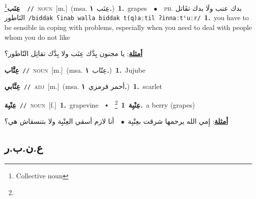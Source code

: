 \documentclass[10pt,a4paper,twoside]{article} %
\begin{document}
\begin{multicols}{2}
{\setlength\topsep{0pt}\textbf{\foreignlanguage{arabic}{عِنَب}}\footnote{Collective noun}\ \ {\color{gray}\texttt{//}\color{black}}\ \textsc{noun}\ [m.]\ \color{gray}(msa. \foreignlanguage{arabic}{عِنَب}~\foreignlanguage{arabic}{\textbf{١.}})\color{black}\ \textbf{1.}~grapes\ \ $\bullet$\ \ \textsc{ph.} \color{gray} \foreignlanguage{arabic}{بدك عنب ولَا بدك تقَاتل النَاطور}\color{black}\ {\color{gray}\texttt{/{\sffamily biddak ʕinab walla biddak t(q)aːtil ʔinnaːtˤuːr}/}\color{black}}\ \textbf{1.}~you have to be sensible in coping with problems, especially when you need to deal with people whom you do not like\  \begin{flushright}\color{gray}\foreignlanguage{arabic}{\textbf{\underline{\foreignlanguage{arabic}{أمثلة}}}: يا مجنون بِدَّك عِنَب ولا بِدَّك تقاتِل النّاطور؟}\end{flushright}\color{black}} \vspace{2mm}

{\setlength\topsep{0pt}\textbf{\foreignlanguage{arabic}{عِنَّاب}}\ {\color{gray}\texttt{//}\color{black}}\ \textsc{noun}\ [m.]\ \color{gray}(msa. \foreignlanguage{arabic}{عِنّاب}~\foreignlanguage{arabic}{\textbf{١.}})\color{black}\ \textbf{1.}~Jujube\ } \vspace{2mm}

{\setlength\topsep{0pt}\textbf{\foreignlanguage{arabic}{عِنَّابي}}\ {\color{gray}\texttt{//}\color{black}}\ \textsc{adj}\ [m.]\ \color{gray}(msa. \foreignlanguage{arabic}{أحمر قرمزي}~\foreignlanguage{arabic}{\textbf{١.}})\color{black}\ \textbf{1.}~scarlet\ } \vspace{2mm}

{\setlength\topsep{0pt}\textbf{\foreignlanguage{arabic}{عِنْبِة}}\ {\color{gray}\texttt{//}\color{black}}\ \textsc{noun}\ [f.]\ \textbf{1.}~grapevine\ \ $\smblkdiamond$\ \ \setlength\topsep{0pt}\textbf{\foreignlanguage{arabic}{عِنْبِة}}\ \footnote{}\ \textbf{1.}~a berry (grapes)\  \begin{flushright}\color{gray}\foreignlanguage{arabic}{\textbf{\underline{\foreignlanguage{arabic}{أمثلة}}}: إِمي الله يرحمها شرقت بعِنْبِة\ $\bullet$\ \  أنا لازم أسقي العِنْبِة ولا بتنسقاش هي؟}\end{flushright}\color{black}} \vspace{2mm}

\vspace{-3mm}
\subsection*{\color{blue}\foreignlanguage{arabic}{ع.ن.ب.ر}\color{blue}{}} 


\end{multicols}
\end{document}
